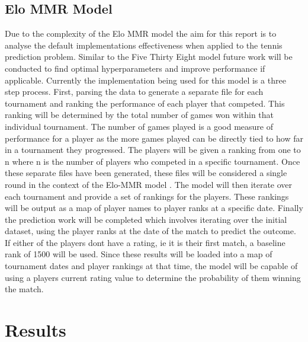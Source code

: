 \documentclass[12pt,a4paper]{article}
\begin{document}
\subsection{Elo MMR Model}
Due to the complexity of the Elo MMR model the aim for this report is to
analyse the default implementations effectiveness when applied to the tennis prediction
problem. Similar to the Five Thirty Eight model future work will be conducted
to find optimal hyperparameters and improve performance if applicable. Currently the
implementation being used for this model is a three step process. First, parsing the data
to generate a separate file for each tournament and ranking the performance of each player
that competed. This ranking will be determined by the total number of games won within
that individual tournament. The number of games played is a good measure of performance
for a player as the more games played can be directly tied to how far in a tournament they
progressed. The players will be given a ranking from one to n where
n is the number of players who competed in a specific tournament. Once these separate files
have been generated, these files will be considered a single round in the context of the
Elo-MMR model \cite{EloMMR2021}. The model will then iterate over each tournament and
provide a set of rankings for the players. These rankings will be output as a map of
player names to player ranks at a specific date. Finally the prediction work will be
completed which involves iterating over the initial dataset, using the player ranks at
the date of the match to predict the outcome. If either of the players dont have a rating,
ie it is their first match, a baseline rank of 1500 will be used. Since these results
will be loaded into a map of tournament dates and player rankings at that time, the model
will be capable of using a players current rating value to determine the probability of them
winning the match.


\clearpage
\section{Results}
\end{document}
